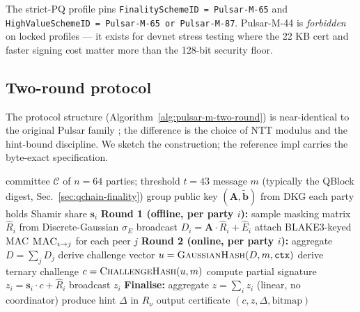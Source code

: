 The strict-PQ profile pins \texttt{FinalitySchemeID = Pulsar-M-65} and
\texttt{HighValueSchemeID = Pulsar-M-65 or Pulsar-M-87}. Pulsar-M-44 is
\emph{forbidden} on locked profiles --- it exists for devnet stress testing
where the 22 KB cert and faster signing cost matter more than the 128-bit
security floor.

\subsection{Two-round protocol}

The protocol structure (Algorithm~\ref{alg:pulsar-m-two-round}) is
near-identical to the original Pulsar family \cite{lp073}; the difference is
the choice of NTT modulus and the hint-bound discipline. We sketch the
construction; the reference impl carries the byte-exact specification.

\begin{algorithm}
\caption{Pulsar-M-65 two-round signing}
\label{alg:pulsar-m-two-round}
\begin{algorithmic}[1]
\Require committee $\mathcal{C}$ of $n=64$ parties; threshold $t=43$
\Require message $m$ (typically the QBlock digest, Sec.~\ref{sec:qchain-finality})
\Require group public key $(\mathbf{A}, \tilde{\mathbf{b}})$ from DKG
\Require each party holds Shamir share $\mathbf{s}_i$
\State \textbf{Round 1 (offline, per party $i$):}
\State \hspace{1em} sample masking matrix $\hat{R}_i$ from Discrete-Gaussian $\sigma_E$
\State \hspace{1em} broadcast $D_i = \mathbf{A} \cdot \hat{R}_i + \hat{E}_i$
\State \hspace{1em} attach BLAKE3-keyed MAC $\textsc{MAC}_{i \to j}$ for each peer $j$
\State \textbf{Round 2 (online, per party $i$):}
\State \hspace{1em} aggregate $D = \sum_j D_j$
\State \hspace{1em} derive challenge vector $u = \textsc{GaussianHash}(D, m, \texttt{ctx})$
\State \hspace{1em} derive ternary challenge $c = \textsc{ChallengeHash}(u, m)$
\State \hspace{1em} compute partial signature $z_i = \mathbf{s}_i \cdot c + \hat{R}_i$
\State \hspace{1em} broadcast $z_i$
\State \textbf{Finalise:}
\State \hspace{1em} aggregate $z = \sum_i z_i$ (linear, no coordinator)
\State \hspace{1em} produce hint $\Delta$ in $R_\nu$
\State \hspace{1em} output certificate $(c, z, \Delta, \text{bitmap})$
\end{algorithmic}
\end{algorithm}

